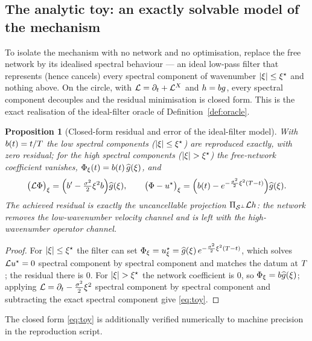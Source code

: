 \documentclass[11pt]{article}
\theoremstyle{plain}
\newtheorem{proposition}[theorem]{Proposition}
\theoremstyle{definition}
\theoremstyle{remark}
\begin{document}
\subsection{The analytic toy: an exactly solvable model of the mechanism}\label{sec:mech-toy}

To isolate the mechanism with no network and no optimisation, replace the free
network by its idealised spectral behaviour --- an ideal low-pass filter that
represents (hence cancels) every spectral component of wavenumber $\lvert\xi\rvert\le\xi^{\star}$
and nothing above. On the circle, with $\mathcal{L}=\partial_{t}+\mathcal{L}^{X}$
and $h=bg$, every spectral component decouples and
the residual minimisation is closed form. This is the exact realisation of the
ideal-filter oracle of Definition~\ref{def:oracle}.

\begin{proposition}[Closed-form residual and error of the ideal-filter model]\label{prop:toy}
With $b(t)=t/T$ the low spectral components
($\lvert\xi\rvert\le\xi^{\star}$) are reproduced exactly, with zero residual;
for the high spectral components ($\lvert\xi\rvert>\xi^{\star}$) the free-network
coefficient vanishes, $\Phi_{\xi}(t)=b(t)\,\widehat{g}(\xi)$, and
\begin{equation}\label{eq:toy}
  \bigl(\mathcal{L}\Phi\bigr)_{\xi}
  =\Bigl(b'-\tfrac{\sigma^{2}}{2}\xi^{2}b\Bigr)\widehat{g}(\xi),
  \qquad
  \bigl(\Phi-u^{\star}\bigr)_{\xi}
  =\Bigl(b(t)-e^{-\frac{\sigma^{2}}{2}\xi^{2}(T-t)}\Bigr)\widehat{g}(\xi).
\end{equation}
The achieved residual is exactly the uncancellable projection
$\Pi_{\mathcal{S}^{\perp}}\mathcal{L}h$: the network removes the
low-wavenumber velocity channel and is left with the high-wavenumber operator
channel.
\end{proposition}
\begin{proof}
For $\lvert\xi\rvert\le\xi^{\star}$ the filter can set
$\Phi_{\xi}=u^{\star}_{\xi}=\widehat{g}(\xi)\,e^{-\frac{\sigma^{2}}{2}\xi^{2}(T-t)}$,
which solves $\mathcal{L}u^{\star}=0$ spectral component by spectral component and matches the datum
at $T$; the residual there is $0$. For $\lvert\xi\rvert>\xi^{\star}$
the network coefficient is $0$, so $\Phi_{\xi}=b\widehat{g}(\xi)$;
applying $\mathcal{L}=\partial_{t}-\tfrac{\sigma^{2}}{2}\xi^{2}$
spectral component by spectral component and subtracting the exact spectral component give \eqref{eq:toy}.
\end{proof}
The closed form \eqref{eq:toy} is additionally verified numerically to machine
precision in the reproduction script.
\end{document}
